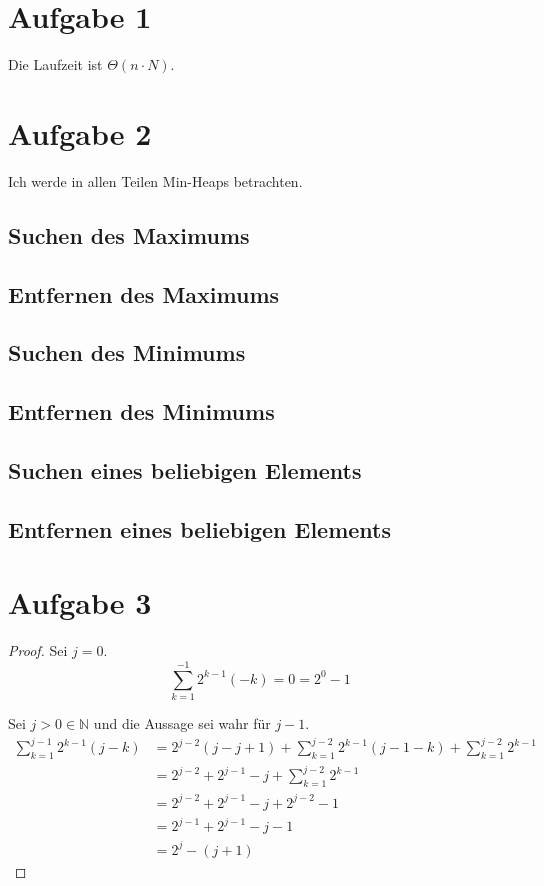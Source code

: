 \documentclass[10pt,a4paper]{article}
\begin{document}
\section{Aufgabe 1}
Die Laufzeit ist $\Theta(n \cdot N)$.

\section{Aufgabe 2}
Ich werde in allen Teilen Min-Heaps betrachten.

\subsection{Suchen des Maximums}

\subsection{Entfernen des Maximums}

\subsection{Suchen des Minimums}

\subsection{Entfernen des Minimums}

\subsection{Suchen eines beliebigen Elements}

\subsection{Entfernen eines beliebigen Elements}

\section{Aufgabe 3}
\begin{proof}
  Sei $j = 0$.
  \begin{equation}
    \sum_{k = 1}^{-1} 2^{k - 1} (-k) = 0 = 2^{0} - 1
  \end{equation}
  
  Sei $j > 0 \in \mathbb{N}$ und die Aussage sei wahr für $j - 1$.
  \begin{align*}
    \sum_{k = 1}^{j - 1} 2^{k - 1} (j - k) & = 2^{j - 2} (j - j + 1) + \sum_{k = 1}^{j - 2} 2^{k - 1} (j - 1 - k) + \sum_{k = 1}^{j - 2} 2^{k - 1}\\
    & = 2^{j - 2} + 2^{j - 1} - j + \sum_{k = 1}^{j - 2} 2^{k - 1}\\
    & = 2^{j - 2} + 2^{j - 1} - j + 2^{j - 2} - 1\\
    & = 2^{j - 1} + 2^{j - 1} - j - 1\\
    & = 2^{j} - (j + 1)
  \end{align*}
\end{proof}
\end{document}
